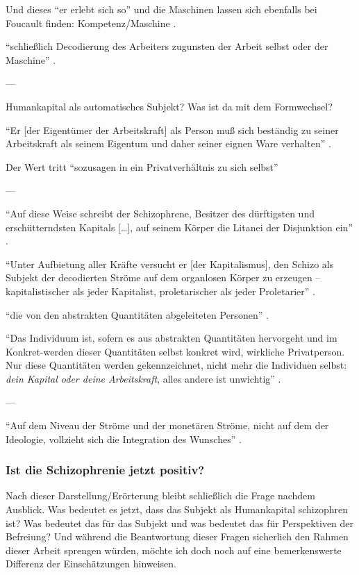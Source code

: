 \documentclass[12pt,
               DIV13,
               paper=a4,
               twoside=false,
               onehalfspacing,
               bibliography=totoc,
               toc=graduated,
               draft,
               ]{scrartcl}
\newcommand{\lips}{\dots\unkern}
\newcommand{\pc}[2]{\parencite[#1]{#2}}
\begin{document}
Und dieses "`er erlebt sich so"' und die Maschinen lassen sich
ebenfalls bei Foucault finden: Kompetenz/Maschine \pc{312+314}{gbp}.

"`schließlich Decodierung des Arbeiters zugunsten der Arbeit selbst
oder der Maschine"' \pc{289}{ao}.

---

Humankapital als automatisches Subjekt? Was ist da mit dem
Formwechsel?

"`Er [der Eigentümer der Arbeitskraft] als Person muß sich beständig
zu seiner Arbeitskraft als seinem Eigentum und daher seiner eignen
Ware verhalten"' \pc{182}{kap}.

Der Wert tritt "`sozusagen in ein Privatverhältnis zu sich selbst"'
\pc{169}{kap}

---

"`Auf diese Weise schreibt der Schizophrene, Besitzer des dürftigsten
und erschütterndsten Kapitals [\lips], auf seinem Körper die Litanei
der Disjunktion ein"' \pc{20}{ao}.

"`Unter Aufbietung aller Kräfte versucht er [der Kapitalismus], den
Schizo als Subjekt der decodierten Ströme auf dem organlosen Körper zu
erzeugen -- kapitalistischer als jeder Kapitalist, proletarischer als
jeder Proletarier"' \pc{S. 44 f.}{ao}.

"`die von den abstrakten Quantitäten abgeleiteten Personen"'
\pc{45}{ao}.

"`Das Individuum ist, sofern es aus abstrakten Quantitäten hervorgeht
und im Konkret-werden dieser Quantitäten selbst konkret wird,
wirkliche \glq Privatperson\grq. Nur diese Quantitäten werden
gekennzeichnet, nicht mehr die Individuen selbst: \emph{dein Kapital
oder deine Arbeitskraft}, alles andere ist unwichtig"' \pc{323}{ao}.

---

"`Auf dem Niveau der Ströme und der monetären Ströme, nicht auf dem
der Ideologie, vollzieht sich die Integration des Wunsches"'
\pc{308}{ao}.

\subsubsection{Ist die Schizophrenie jetzt positiv?}

Nach dieser Darstellung/Erörterung bleibt schließlich die Frage
nachdem Ausblick. Was bedeutet es jetzt, dass das Subjekt als
Humankapital schizophren ist? Was bedeutet das für das Subjekt und was
bedeutet das für Perspektiven der Befreiung? Und während die
Beantwortung dieser Fragen sicherlich den Rahmen dieser Arbeit
sprengen würden, möchte ich doch noch auf eine bemerkenswerte
Differenz der Einschätzungen hinweisen.
\end{document}
